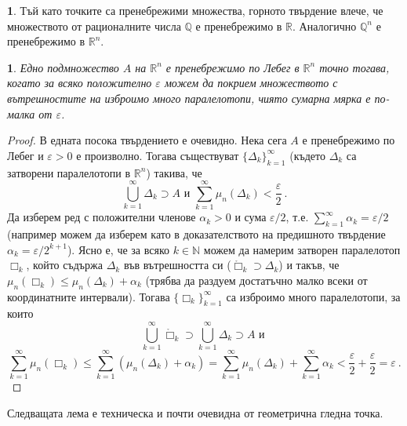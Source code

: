 \documentclass[11pt]{article}
\numberwithin{equation}{section}
\numberwithin{figure}{section}
\numberwithin{table}{section}
\theoremstyle{plain}
\theoremstyle{definition}
\theoremstyle{remark}
\theoremstyle{definition}
\theoremstyle{remark}
\theoremstyle{plain}
\theoremstyle{definition}
\theoremstyle{definition}
\newtheorem{example}[thm]{\protect\examplename}
\theoremstyle{plain}
\theoremstyle{plain}
\newtheorem{prop}[thm]{\protect\propositionname}
\theoremstyle{plain}
\theoremstyle{definition}
\theoremstyle{plain}
\providecommand{\examplename}{Пример}
\providecommand{\propositionname}{Твърдение}
\newcommand*{\R}{\mathbb{R}}
\newcommand*{\N}{\mathbb{N}}
\newcommand*{\Q}{\mathbb{Q}}
\begin{document}
\bigskip

\begin{example}
Тъй като точките са пренебрежими множества, горното твърдение влече, че множеството от рационалните числа $\Q$ е пренебрежимо в $\R$. Аналогично $\Q^n$ е пренебрежимо в $\R^n$.
\end{example}

\begin{prop}\label{negligibleinteriors}
Едно подмножество $A$ на $\R^n$ е пренебрежимо по Лебег в $\R^n$ точно тогава, когато за всяко положително $\varepsilon$ можем да покрием множеството с вътрешностите на изброимо много паралелотопи, чиято сумарна мярка е по-малка от $\varepsilon$. 
\end{prop}
\begin{proof}
В едната посока твърдението е очевидно. Нека сега $A$ е пренебрежимо по Лебег и $\varepsilon >0$ е произволно. Тогава съществуват $\{\Delta_k \}_{k=1}^\infty$ (където $\Delta_k$ са затворени паралелотопи в $\R^n$) такива, че $$\bigcup_{k=1}^\infty \Delta_k \supset A  \mbox{ и } \sum_{k=1}^\infty \mu_n(\Delta_k)<\frac{\varepsilon}{2} \ .$$
Да изберем ред с положителни членове $\alpha_k>0$ и сума $\varepsilon/2$, т.е. $\sum_{k=1}^\infty \alpha_k=\varepsilon/2$ (например можем да изберем като в доказателството на предишното твърдение $\alpha_k=\varepsilon/2^{k+1}$). Ясно е, че за всяко $k\in \N$ можем да намерим затворен паралелотоп $\Box_k$, който съдържа $\Delta_k$ във вътрешността си ($\mathring \Box_k \supset\Delta_k$) и такъв, че $\mu_n(\Box_k)\le \mu_n(\Delta_k)+\alpha_k$ (трябва да раздуем достатъчно малко всеки от координатните интервали). Тогава $\{\Box_k \}_{k=1}^\infty$ са изброимо много паралелотопи, за които
$$\bigcup_{k=1}^\infty \mathring \Box_k\supset \bigcup_{k=1}^\infty \Delta_k\supset A \mbox{ и } $$
$$\sum_{k=1}^\infty \mu_n(\Box_k)\le \sum_{k=1}^\infty (\mu_n(\Delta_k)+\alpha_k) =
\sum_{k=1}^\infty \mu_n(\Delta_k) +\sum_{k=1}^\infty \alpha_k <\frac{\varepsilon}{2}+\frac{\varepsilon}{2}=\varepsilon \ .$$
\end{proof}

Следващата лема е техническа и почти очевидна от геометрична гледна точка.
\end{document}
